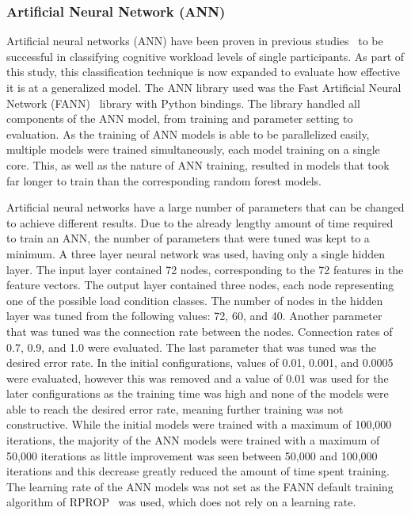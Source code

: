 \documentclass[11pt]{article}
\begin{document}
		\subsubsection{Artificial Neural Network (ANN)}
		Artificial neural networks (ANN) have been proven in previous studies~\cite{Wilson, Estepp_2015} to be successful in classifying cognitive workload levels of single participants. As part of this study, this classification technique is now expanded to evaluate how effective it is at a generalized model. The ANN library used was the Fast Artificial Neural Network (FANN)~\cite{FANN} library with Python bindings. The library handled all components of the ANN model, from training and parameter setting to evaluation. As the training of ANN models is able to be parallelized easily, multiple models were trained simultaneously, each model training on a single core. This, as well as the nature of ANN training, resulted in models that took far longer to train than the corresponding random forest models.
		
		Artificial neural networks have a large number of parameters that can be changed to achieve different results. Due to the already lengthy amount of time required to train an ANN, the number of parameters that were tuned was kept to a minimum. A three layer neural network was used, having only a single hidden layer. The input layer contained 72 nodes, corresponding to the 72 features in the feature vectors. The output layer contained three nodes, each node representing one of the possible load condition classes. The number of nodes in the hidden layer was tuned from the following values: 72, 60, and 40. Another parameter that was tuned was the connection rate between the nodes. Connection rates of 0.7, 0.9, and 1.0 were evaluated. The last parameter that was tuned was the desired error rate. In the initial configurations, values of 0.01, 0.001, and 0.0005 were evaluated, however this was removed and a value of 0.01 was used for the later configurations as the training time was high and none of the models were able to reach the desired error rate, meaning further training was not constructive. While the initial models were trained with a maximum of 100,000 iterations, the majority of the ANN models were trained with a maximum of 50,000 iterations as little improvement was seen between 50,000 and 100,000 iterations and this decrease greatly reduced the amount of time spent training. The learning rate of the ANN models was not set as the FANN default training algorithm of RPROP~\cite{Riedmiller} was used, which does not rely on a learning rate.
\end{document}
